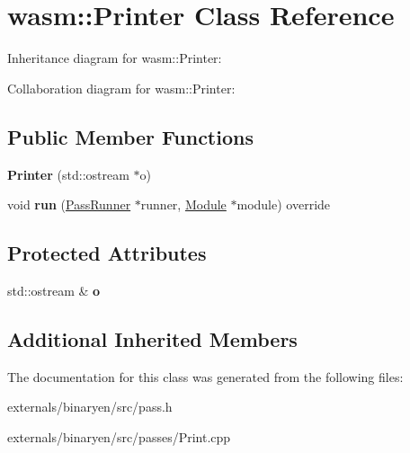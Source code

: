 \hypertarget{classwasm_1_1_printer}{}\section{wasm\+:\+:Printer Class Reference}
\label{classwasm_1_1_printer}


Inheritance diagram for wasm\+:\+:Printer\+:


Collaboration diagram for wasm\+:\+:Printer\+:
\subsection*{Public Member Functions}
\begin{DoxyCompactItemize}
\item 
\mbox{\label{classwasm_1_1_printer_a15061a7b70b26fb3a3541dae24afcc23}} 
{\bfseries Printer} (std\+::ostream $\ast$o)
\item 
\mbox{\label{classwasm_1_1_printer_a718bbca8c6cee9135ac8cdb349e0bf62}} 
void {\bfseries run} (\mbox{\hyperlink{structwasm_1_1_pass_runner}{Pass\+Runner}} $\ast$runner, \mbox{\hyperlink{classwasm_1_1_module}{Module}} $\ast$module) override
\end{DoxyCompactItemize}
\subsection*{Protected Attributes}
\begin{DoxyCompactItemize}
\item 
\mbox{\label{classwasm_1_1_printer_a76a29a886787606d00dcf2cb16ee490a}} 
std\+::ostream \& {\bfseries o}
\end{DoxyCompactItemize}
\subsection*{Additional Inherited Members}


The documentation for this class was generated from the following files\+:\begin{DoxyCompactItemize}
\item 
externals/binaryen/src/pass.\+h\item 
externals/binaryen/src/passes/Print.\+cpp\end{DoxyCompactItemize}
